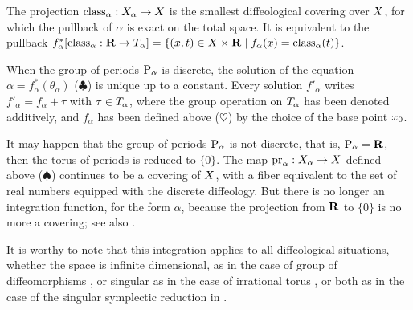 \begin{article}
   The projection $\operatorname{class}_\alpha : X_\alpha \to X$ is the smallest diffeological covering over $X$,
  for which the pullback of $\alpha$ is exact on the total space.
  It is equivalent to the pullback $f_\alpha^*[\operatorname{class}_\alpha : {\mathbf R} \to T_\alpha] = \{(x,t) \in X \times {\mathbf R} \mid f_\alpha(x) = \operatorname{class}_\alpha(t) \}$.
  
   When the group of periods ${\operatorname{P}}_\alpha$ is discrete,
  the solution of the equation $\alpha = f_\alpha^*(\theta_\alpha)$ ($\clubsuit$) is unique up to a constant.
  Every solution $f'_\alpha$ writes $f'_\alpha = f_\alpha + \tau$ with $\tau \in T_\alpha$,
  where the group operation on $T_\alpha$ has been denoted additively,
  and $f_\alpha$ has been defined above ($\heartsuit$) by the choice of the base point ${x_0}$.
  
   It may happen that the group of periods ${\operatorname{P}}_\alpha$ is not discrete,
  that is,
  ${\operatorname{P}}_\alpha = {\mathbf R}$,
  then the torus of periods is reduced to $\{0\}$.
  The map $\mathrm{pr}_\alpha : X_\alpha \to X$ defined above ($\spadesuit$) continues to be a covering of $X$,
  with a fiber equivalent to the set of real numbers equipped with the discrete diffeology.
  But there is no longer an integration function,
  for the form $\alpha$,
  because the projection from ${\mathbf R}$ to $\{0\}$ is no more a covering;
  see also .
  
   It is worthy to note that this integration applies to all diffeological situations,
  whether the space is infinite dimensional,
  as in the case of group of diffeomorphisms ,
  or singular as in the case of irrational torus ,
  or both as in the case of the singular symplectic reduction in \cite{PIZ15}.
\end{article} %

